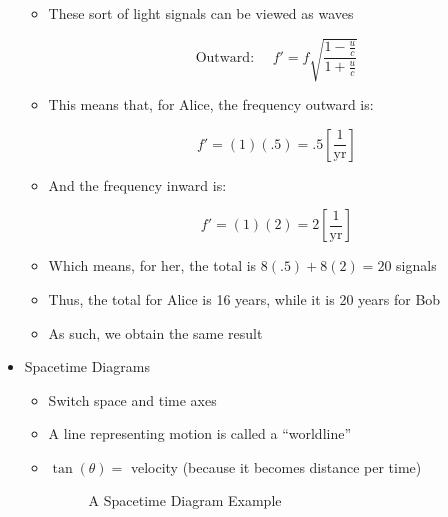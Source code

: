 \begin{itemize}
\begin{itemize}
      \item These sort of light signals can be viewed as waves

        $$\boxed{\text{Outward:}\,\,\,\,\,\,\,\,f'=f\sqrt{\frac{1-\frac{u}{c}}{1+\frac{u}{c}}}}$$

      \item This means that, for Alice, the frequency outward is:

        $$f'=(1)(.5)=.5\left[\frac{1}{\text{yr}}\right]$$

      \item And the frequency inward is:

        $$f'=(1)(2)=2\left[\frac{1}{\text{yr}}\right]$$

      \item Which means, for her, the total is $8(.5) + 8(2) = 20$ signals

      \item Thus, the total for Alice is 16 years, while it is 20 years for Bob

      \item As such, we obtain the same result

    \end{itemize}

  \item Spacetime Diagrams

    \begin{itemize}

      \item Switch space and time axes

      \item A line representing motion is called a ``worldline''

      \item $\tan(\theta)=$ velocity (because it becomes distance per time)

        \begin{figure}[h!]
          \centering
          
          \caption{A Spacetime Diagram Example}
          \label{fig:4}
        \end{figure}

    \end{itemize}

\end{itemize}



